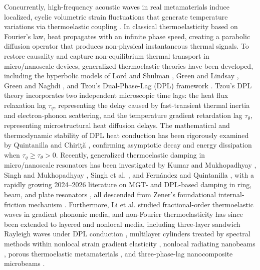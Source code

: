 \documentclass[11pt,a4paper]{article}
\begin{document}
Concurrently, high-frequency acoustic waves in real metamaterials induce localized, cyclic volumetric strain fluctuations that generate temperature variations via thermoelastic coupling \cite{biot1956thermoelasticity}. In classical thermoelasticity based on Fourier's law, heat propagates with an infinite phase speed, creating a parabolic diffusion operator that produces non-physical instantaneous thermal signals. To restore causality and capture non-equilibrium thermal transport in micro/nanoscale devices, generalized thermoelastic theories have been developed, including the hyperbolic models of Lord and Shulman \cite{lord1967generalized}, Green and Lindsay \cite{green1972thermoelasticity}, Green and Naghdi \cite{green1991reexamination}, and Tzou's Dual-Phase-Lag (DPL) framework \cite{tzou1995unified,tzou2014macro,chandrasekharaiah1998hyperbolic}. Tzou's DPL theory incorporates two independent microscopic time lags: the heat flux relaxation lag $\tau_q$, representing the delay caused by fast-transient thermal inertia and electron-phonon scattering, and the temperature gradient retardation lag $\tau_\theta$, representing microstructural heat diffusion delays. The mathematical and thermodynamic stability of DPL heat conduction has been rigorously examined by Quintanilla \cite{quintanilla2002damped} and Chiri\c{t}\u{a} \cite{chirita2017time}, confirming asymptotic decay and energy dissipation when $\tau_q \ge \tau_\theta > 0$. Recently, generalized thermoelastic damping in micro/nanoscale resonators has been investigated by Kumar and Mukhopadhyay \cite{kumar2022surface}, Singh and Mukhopadhyay \cite{singh2021galerkin}, Singh et al. \cite{singh2022analytical}, and Fern\'andez and Quintanilla \cite{fernandez2021moore}, with a rapidly growing 2024--2026 literature on MGT- and DPL-based damping in ring, beam, and plate resonators \cite{zhou2024generalized,ge2024theoretical,zhou2025comprehensive,shao2026singlephaselag,garleanu2025nonlocal,zhuang2026thermoelastic,kareem2025thermoelastic,srivastava2024damping,srivastava2025vibration,singh2024thermoelastic,ghribi2024two,liu2024ted}, all descended from Zener's foundational internal-friction mechanism \cite{zener1937internal}. Furthermore, Li et al. \cite{li2026thermoelastic} studied fractional-order thermoelastic waves in gradient phononic media, and non-Fourier thermoelasticity has since been extended to layered and nonlocal media, including three-layer sandwich Rayleigh waves under DPL conduction \cite{youssef2024nonlinear}, multilayer cylinders treated by spectral methods within nonlocal strain gradient elasticity \cite{li2026spectral}, nonlocal radiating nanobeams \cite{carini2025nonlocal}, porous thermoelastic metamaterials \cite{hosseini2025porosity}, and three-phase-lag nanocomposite microbeams \cite{zhang2026investigation}.
\end{document}
